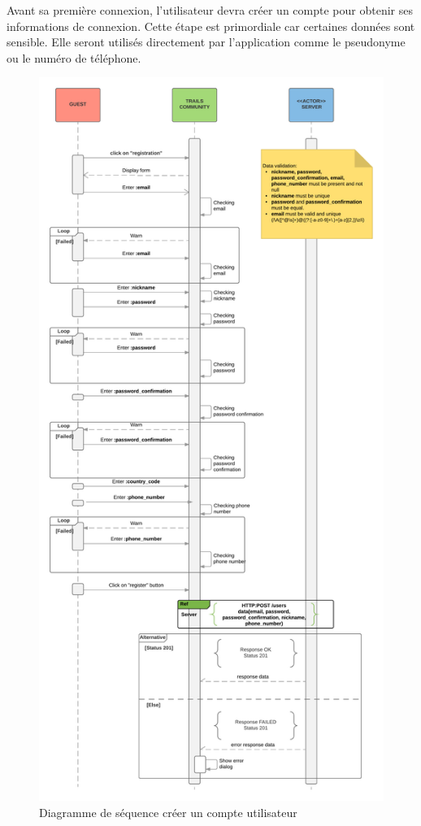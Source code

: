 \documentclass[titlepage, 12pt]{report}
\begin{document}
Avant sa première connexion, l'utilisateur devra créer un compte pour obtenir ses informations de connexion. Cette étape est primordiale car certaines données sont sensible. Elle seront utilisés directement par l'application comme le pseudonyme ou le numéro de téléphone.


\begin{figure}[!h]
	\caption{Diagramme de séquence créer un compte utilisateur}
	\label{register_sequence_diagram}
	\centering
	\includegraphics[scale=0.12]{Images/diagram/registration_sequence_diagram.png}
\end{figure}
\end{document}
